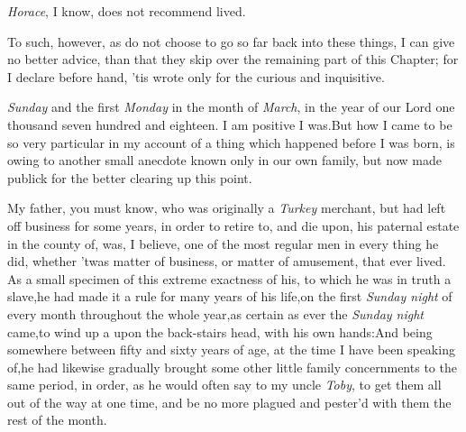 \documentclass{article}
\begin{document}
\textit{Horace}, I know, does not recommend 
lived.

To such, however, as do not choose to 
go so far back into these things, I can\break
give no better advice, than that they\break
skip over the remaining part of this\break 
Chapter; for I declare before hand, ’tis
wrote only for the curious and inquisitive.

\noindent
{}\break
{}
\textit{Sunday} and the first
\textit{Monday} in the month of \textit{March}, in the year of our Lord one thousand
seven hundred and eighteen.\break
I am positive I was.\tsk  But how I came to be so very
particular in my account of a thing which happened before I was born, is owing to
another small anecdote known only in our own family, but now made publick for the
better clearing up this point.

My father, you must know, who was originally a \textit{Turkey}
merchant, but had left off business for some years, in order to
retire to, and die upon, his paternal estate in the county of\tsh, 
was, I believe, one of the most regular men in
every thing he did, whether ’twas matter of business, or
matter of amusement, that ever lived. As a small specimen of this
extreme exactness of his, to which he was in truth a slave,\tsk he had
made it a rule for many years of his life,\tsk  on the first
\textit{Sunday night} of every month throughout the whole
year,\tsk  as certain as ever the \textit{Sunday night}
came,\tsk  to wind up a 
upon the back-stairs head, with his own hands:\tsk  And being
somewhere between fifty and sixty years of age, at the time I
have been speaking of,\tsk  he had likewise gradually
brought some other little family concernments to the same period,
in order, as he would often say to my uncle \textit{Toby}, to get
them all out of the way at one time, and be no more plagued
and pester’d with them the rest of the month.
\end{document}
